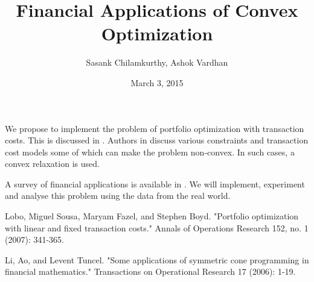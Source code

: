 \documentclass[a4paper]{article}
\begin{document}
\title{Financial Applications of Convex Optimization}
\author{Sasank Chilamkurthy, Ashok Vardhan}
\date{March 3, 2015}
\maketitle

We propose to implement the problem of portfolio optimization with transaction costs.
This is discussed in \cite{main}. Authors in \cite{main} discuss various constraints and transaction cost models some of which can make the problem non-convex. In such cases, a convex relaxation is used. 

A survey of financial applications is available in \cite{survey}.
We will implement, experiment and analyse this problem using the data from the real world.

\begin{thebibliography}{4}

  Lobo, Miguel Sousa, Maryam Fazel, and Stephen Boyd. "Portfolio optimization with linear and fixed transaction costs." Annals of Operations Research 152, no. 1 (2007): 341-365.

 Li, Ao, and Levent Tuncel. "Some applications of symmetric cone programming in financial mathematics." Transactions on Operational Research 17 (2006): 1-19.

\end{thebibliography}
\end{document}
